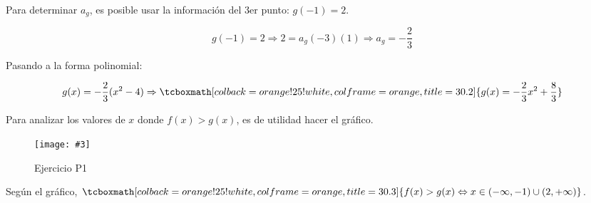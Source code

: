 \documentclass{article}
\newcommand{\hresult}[2]{\tcboxmath[colback=orange!25!white,colframe=orange, title=#1] {#2} }
\newcommand{\figurex}[4]{\begin{figure}[ht] \caption{#1} \texttt{[image: \#3]} \centering \label{#4}\end{figure}}
\begin{document}
Para determinar $ a_g $, es posible usar la información del 3er punto: $ g(-1) = 2 $.

\begin{equation}
g(-1) = 2 \Rightarrow 2 = a_g (-3) (1) \Rightarrow a_g = -\frac{2}{3}
\end{equation}

Pasando a la forma polinomial:

\begin{equation}
g(x) = -\frac{2}{3} (x^2 - 4) \Rightarrow \hresult{30.2}{ g(x) = -\frac{2}{3} x^2 + \frac{8}{3} }
\end{equation}

Para analizar los valores de $ x $ donde $ f(x) > g(x) $, es de utilidad hacer el gráfico.

\figurex{Ejercicio P1}{3}{../img/guide_01/ex_p1.png}{fig:p1}

Según el gráfico, $ \hresult{30.3}{ f(x) > g(x) \Leftrightarrow x \in (-\infty, -1) \cup (2, +\infty) } $. 
\end{document}
